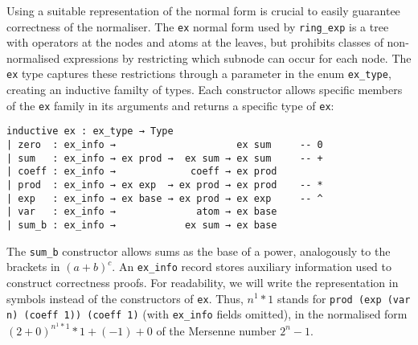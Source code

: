 \documentclass{llncs}
\newcommand{\lean}[1]{\texttt{#1}\xspace} %
\newcommand{\ex}{\lean{ex}}
\newcommand{\ring}{\lean{ring}}
\newcommand{\ringexp}{\lean{ring\_exp}}
\begin{document}
Using a suitable representation of the normal form is crucial to easily guarantee correctness of the normaliser.
The \ex normal form used by \ringexp is a tree with operators at the nodes and atoms at the leaves,
but prohibits classes of non-normalised expressions by restricting which subnode can occur for each node.
The \ex type captures these restrictions through a parameter in the enum \lean{ex\_type},
creating an inductive familty of types.
Each constructor allows specific members of the \ex family in its arguments
and returns a specific type of \ex:
\begin{lstlisting}
inductive ex : ex_type → Type
| zero  : ex_info →                     ex sum     -- 0
| sum   : ex_info → ex prod →  ex sum → ex sum     -- +
| coeff : ex_info →             coeff → ex prod
| prod  : ex_info → ex exp  → ex prod → ex prod    -- *
| exp   : ex_info → ex base → ex prod → ex exp     -- ^
| var   : ex_info →              atom → ex base
| sum_b : ex_info →            ex sum → ex base
\end{lstlisting}
The \lean{sum\_b} constructor allows sums as the base of a power, analogously to the brackets in $(a + b) ^ c$.
An \lean{ex\_info} record stores auxiliary information used to construct correctness proofs.
For readability, we will write the representation in symbols instead of the constructors of \ex.
Thus, $n^1 * 1$ stands for \lean{prod (exp (var n) (coeff 1)) (coeff 1)} (with \lean{ex\_info} fields omitted),
in the normalised form $(2+0)^{n^1 * 1} * 1 + (-1) + 0$ of the Mersenne number $2^n - 1$.
\end{document}

